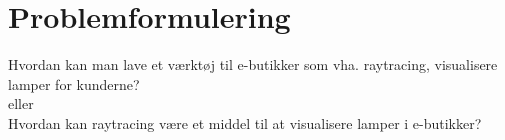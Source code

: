 \section{Problemformulering}
Hvordan kan man lave et værktøj til e-butikker som vha. raytracing, visualisere lamper for kunderne?
\\eller\\
Hvordan kan raytracing være et middel til at visualisere lamper i e-butikker?